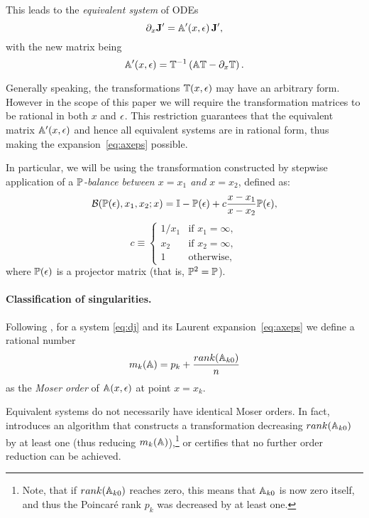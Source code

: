 \documentclass[12pt,a4paper]{article}
\begin{document}
This leads to the {\em equivalent system} of ODEs
\begin{equation}
  \partial_x \mathbf{J}' = \mathbb{A}'(x,\epsilon)\,\mathbf{J}',
\end{equation}
with the new matrix being
\begin{equation}
\label{eq:ta}
  \mathbb{A}'(x,\epsilon) = \mathbb{T}^{-1} \left( \mathbb{A} \mathbb{T} - \partial_x \mathbb{T} \right).
\end{equation}

Generally speaking, the transformations $\mathbb{T}(x,\epsilon)$ may have an arbitrary form.
However in the scope of this paper we will require the transformation matrices to be rational in both $x$ and $\epsilon$.
This restriction guarantees that the equivalent matrix $\mathbb{A}'(x,\epsilon)$ and hence all equivalent systems are in rational form, thus making the expansion~\eqref{eq:axeps} possible.

In particular, we will be using the transformation constructed by stepwise application of a \textit{$\mathbb{P}$-balance between $x=x_1$ and $x=x_2$}, defined as:
\begin{equation}
\label{eq:bal}
    \mathcal{B}(\mathbb{P}(\epsilon), x_1, x_2; x) = \mathbb{I} - \mathbb{P}(\epsilon) + c \frac{x-x_1}{x-x_2} \mathbb{P}(\epsilon),
\end{equation}
\begin{equation*}
    c \equiv
    \begin{cases}
        1/x_1 & \text{if $x_1=\infty$}, \\
        x_2 & \text{if $x_2=\infty$}, \\
        1 & \text{otherwise},
    \end{cases}
\end{equation*}
where $\mathbb{P}(\epsilon)$ is a projector matrix (that is, $\mathbb{P}^2=\mathbb{P}$).

\paragraph{Classification of singularities.}
Following \cite{Mos59}, for a system \eqref{eq:dj} and its Laurent expansion~\eqref{eq:axeps} we define a rational number
\begin{equation}
\label{eq:mk}
    m_k(\mathbb{A}) = p_k + \frac{rank(\mathbb{A}_{k0})}{n}
\end{equation}
as the {\em Moser order} of $\mathbb{A}(x,\epsilon)$ at point $x=x_k$.

Equivalent systems do not necessarily have identical Moser orders.
In fact, \cite{Mos59} introduces an algorithm that constructs a transformation decreasing $rank(\mathbb{A}_{k0})$ by at least one (thus reducing $m_k(\mathbb{A})$),\footnote{Note, that if $rank(\mathbb{A}_{k0})$ reaches zero, this means that $\mathbb{A}_{k0}$ is now zero itself, and thus the Poincar\'e rank $p_k$ was decreased by at least one.} or certifies that no further order reduction can be achieved.
\end{document}
